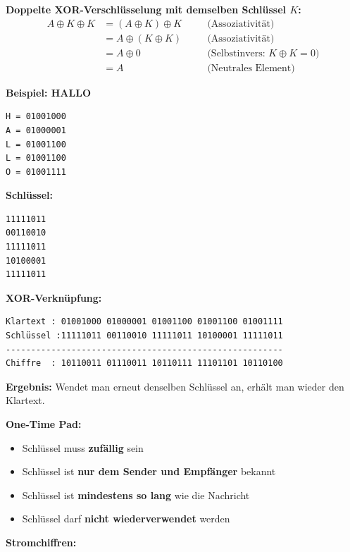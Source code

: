 \documentclass[a4paper,12pt]{article}
\begin{document}
\vspace{1em}

\begin{tcolorbox}[title=Doppelte XOR-Verschlüsselung mit demselben Schlüssel, colback=blue!5!white, colframe=blue!75!black]
\noindent\textbf{Doppelte XOR-Verschlüsselung mit demselben Schlüssel \(K\):}
\begin{align*}
A \oplus K \oplus K 
&= (A \oplus K) \oplus K \quad &&\text{(Assoziativität)} \\
&= A \oplus (K \oplus K) \quad &&\text{(Assoziativität)} \\
&= A \oplus 0 \quad &&\text{(Selbstinvers: $K \oplus K = 0$)} \\
&= A \quad &&\text{(Neutrales Element)}
\end{align*}

\vspace{1em}
\noindent\textbf{Beispiel: HALLO}
\begin{verbatim}
H = 01001000
A = 01000001
L = 01001100
L = 01001100
O = 01001111
\end{verbatim}

\textbf{Schlüssel:}
\begin{verbatim}
11111011
00110010
11111011
10100001
11111011
\end{verbatim}

\textbf{XOR-Verknüpfung:}
\begin{verbatim}
Klartext : 01001000 01000001 01001100 01001100 01001111
Schlüssel :11111011 00110010 11111011 10100001 11111011
-------------------------------------------------------
Chiffre  : 10110011 01110011 10110111 11101101 10110100
\end{verbatim}

\textbf{Ergebnis:}  
Wendet man erneut denselben Schlüssel an, erhält man wieder den Klartext.
\end{tcolorbox}
\vspace{1em}
\noindent\textbf{One-Time Pad:}
\begin{itemize}
    \item Schlüssel muss \textbf{zufällig} sein
    \item Schlüssel ist \textbf{nur dem Sender und Empfänger} bekannt
    \item Schlüssel ist \textbf{mindestens so lang} wie die Nachricht
    \item Schlüssel darf \textbf{nicht wiederverwendet} werden
\end{itemize}

\noindent\textbf{Stromchiffren:}
\end{document}
